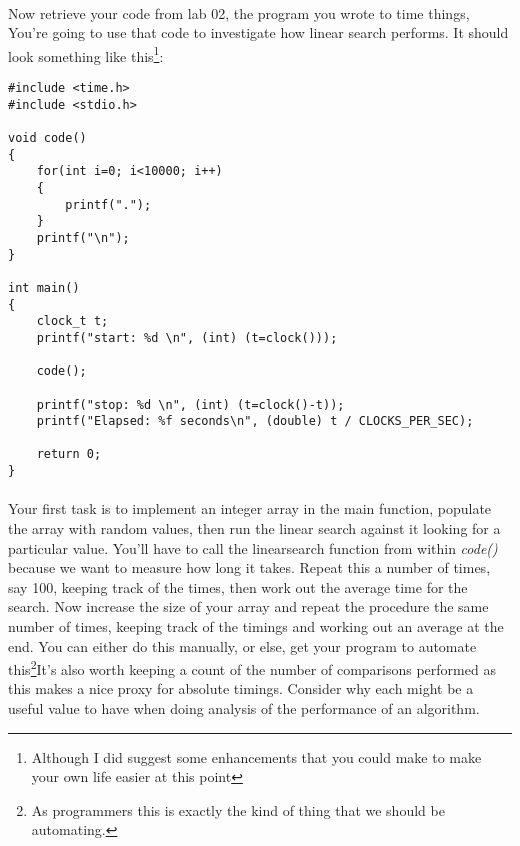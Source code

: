 \documentclass[10pt, a4paper, twosize]{article}
\begin{document}
\paragraph{} Now retrieve your code from lab 02, the program you wrote to time things, You're going to use that code to investigate how linear search performs. It should look something like this\footnote{Although I did suggest some enhancements that you could make to make your own life easier at this point}:

\begin{lstlisting}
#include <time.h>
#include <stdio.h>

void code()
{
    for(int i=0; i<10000; i++)
    {
        printf(".");
    }    
    printf("\n");
}

int main()
{
    clock_t t;
    printf("start: %d \n", (int) (t=clock()));

    code();

    printf("stop: %d \n", (int) (t=clock()-t));
    printf("Elapsed: %f seconds\n", (double) t / CLOCKS_PER_SEC);

    return 0;
}
\end{lstlisting}

\paragraph{} Your first task is to implement an integer array in the main function, populate the array with random values, then run the linear search against it looking for a particular value. You'll have to call the linearsearch function from within \emph{code()} because we want to measure how long it takes. Repeat this a number of times, say 100, keeping track of the times, then work out the average time for the search. Now increase the size of your array and repeat the procedure the same number of times, keeping track of the timings and working out an average at the end. You can either do this manually, or else, get your program to automate this\footnote{As programmers this is exactly the kind of thing that we should be automating.}It's also worth keeping a count of the number of comparisons performed as this makes a nice proxy for absolute timings. Consider why each might be a useful value to have when doing analysis of the performance of an algorithm.
\end{document}

